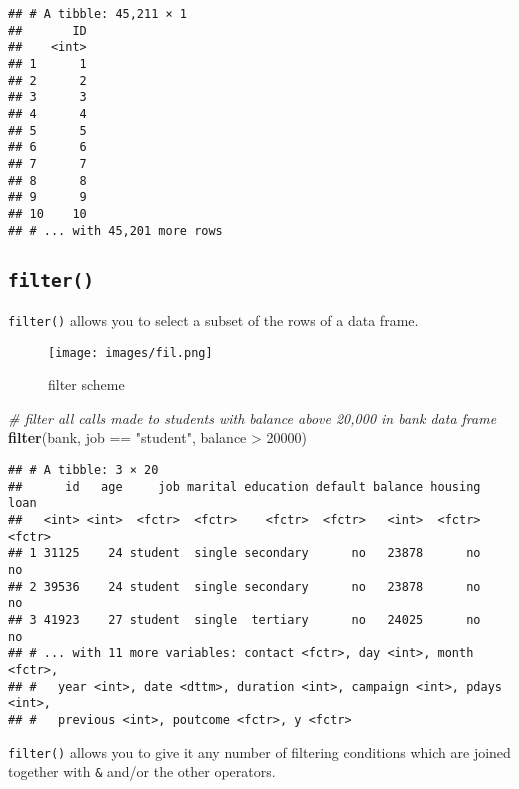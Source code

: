 \documentclass[]{book}
\newenvironment{Shaded}{\begin{snugshade}}{\end{snugshade}}
\newcommand{\KeywordTok}[1]{\textcolor[rgb]{0.13,0.29,0.53}{\textbf{{#1}}}}
\newcommand{\DecValTok}[1]{\textcolor[rgb]{0.00,0.00,0.81}{{#1}}}
\newcommand{\StringTok}[1]{\textcolor[rgb]{0.31,0.60,0.02}{{#1}}}
\newcommand{\CommentTok}[1]{\textcolor[rgb]{0.56,0.35,0.01}{\textit{{#1}}}}
\newcommand{\NormalTok}[1]{{#1}}
\begin{document}
\begin{verbatim}
## # A tibble: 45,211 × 1
##       ID
##    <int>
## 1      1
## 2      2
## 3      3
## 4      4
## 5      5
## 6      6
## 7      7
## 8      8
## 9      9
## 10    10
## # ... with 45,201 more rows
\end{verbatim}

\subsection{\texorpdfstring{\texttt{filter()}}{filter()}}\label{filter}

\texttt{filter()} allows you to select a subset of the rows of a data
frame.

\begin{figure}[htbp]
\centering
\texttt{[image: images/fil.png]}
\caption{filter scheme}
\end{figure}

\begin{Shaded}
\begin{Highlighting}[]
\CommentTok{# filter all calls made to students with balance above 20,000 in bank data frame}
\KeywordTok{filter}\NormalTok{(bank, job ==}\StringTok{ "student"}\NormalTok{, balance >}\StringTok{ }\DecValTok{20000}\NormalTok{)}
\end{Highlighting}
\end{Shaded}

\begin{verbatim}
## # A tibble: 3 × 20
##      id   age     job marital education default balance housing   loan
##   <int> <int>  <fctr>  <fctr>    <fctr>  <fctr>   <int>  <fctr> <fctr>
## 1 31125    24 student  single secondary      no   23878      no     no
## 2 39536    24 student  single secondary      no   23878      no     no
## 3 41923    27 student  single  tertiary      no   24025      no     no
## # ... with 11 more variables: contact <fctr>, day <int>, month <fctr>,
## #   year <int>, date <dttm>, duration <int>, campaign <int>, pdays <int>,
## #   previous <int>, poutcome <fctr>, y <fctr>
\end{verbatim}

\texttt{filter()} allows you to give it any number of filtering
conditions which are joined together with \texttt{\&} and/or the other
operators.

\begin{Shaded}
\end{Shaded}
\end{document}
